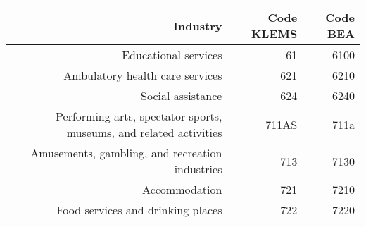 \begin{landscape}
\begin{table}[h]
    \begin{center}
        \begin{tabular}{rrr}
            Industry                                                             & Code KLEMS & Code BEA   \\%
            \hline\hline
            Educational services                                                 & 61          & 6100      \\%
            Ambulatory health care services                                      & 621         & 6210      \\%
            Social assistance                                                    & 624         & 6240      \\%
Performing arts, spectator sports, museums, and related activities   & 711AS       & 711a      \\%
Amusements, gambling, and recreation industries                      & 713         & 7130      \\%
Accommodation                                                        & 721         & 7210      \\%
Food services and drinking places                                    & 722         & 7220      \\%

\end{tabular}
\end{center}
\end{table}
\end{landscape}

